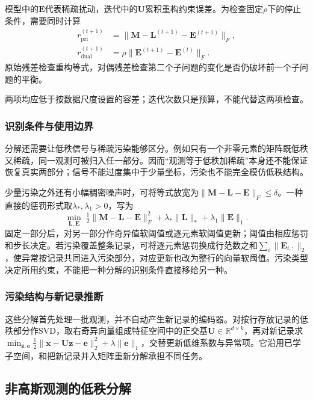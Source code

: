 模型中的$\bm{E}$代表稀疏扰动，迭代中的$\bm{U}$累积重构约束误差。为检查固定$\rho$下的停止条件，需要同时计算
\[
  \begin{aligned}
    r_{\mathrm{pri}}^{(t+1)}
      &=\lVert\bm{M}-\bm{L}^{(t+1)}-\bm{E}^{(t+1)}\rVert_F,\\
    r_{\mathrm{dual}}^{(t+1)}
      &=\rho\lVert\bm{E}^{(t+1)}-\bm{E}^{(t)}\rVert_F.
  \end{aligned}
\]
原始残差检查重构等式，对偶残差检查第二个子问题的变化是否仍破坏前一个子问题的平衡。

两项均应低于按数据尺度设置的容差；迭代次数只是预算，不能代替这两项检查。

\subsubsection{识别条件与使用边界}

分解还需要让低秩信号与稀疏污染能够区分。例如只有一个非零元素的矩阵既低秩又稀疏，同一观测可被归入任一部分。因而“观测等于低秩加稀疏”本身还不能保证恢复真实两部分；信号不能过度集中于少量坐标，污染也不能完全模仿低秩结构。

少量污染之外还有小幅稠密噪声时，可将等式放宽为$\lVert\bm M-\bm L-\bm E\rVert_F\leq\delta$。一种直接的惩罚形式取$\lambda_*,\lambda_1>0$，写为
\[
 \min_{\bm L,\bm E}\;
 \tfrac12\lVert\bm M-\bm L-\bm E\rVert_F^2
 +\lambda_*\lVert\bm L\rVert_*+\lambda_1\lVert\bm E\rVert_1.
\]
固定一部分后，对另一部分作奇异值软阈值或逐元素软阈值更新；阈值由相应惩罚和步长决定。若污染覆盖整条记录，可将逐元素惩罚换成行范数之和$\sum_i\lVert\bm E_{i,:}\rVert_2$，使异常按记录共同进入污染部分，对应更新也改为整行的向量软阈值。污染类型决定所用约束，不能把一种分解的识别条件直接移给另一种。

\subsubsection{污染结构与新记录推断}

这些分解首先处理一批观测，并不自动产生新记录的编码器。对按行存放记录的低秩部分作SVD，取右奇异向量组成特征空间中的正交基$\bm U\in\mathbb R^{d\times k}$，再对新记录求$\min_{\bm z,\bm e}\frac12\lVert\bm x-\bm U\bm z-\bm e\rVert_2^2+\lambda\lVert\bm e\rVert_1$，交替更新低维系数与异常项。它沿用已学子空间，和把新记录并入矩阵重新分解承担不同任务。

\subsection{非高斯观测的低秩分解}

